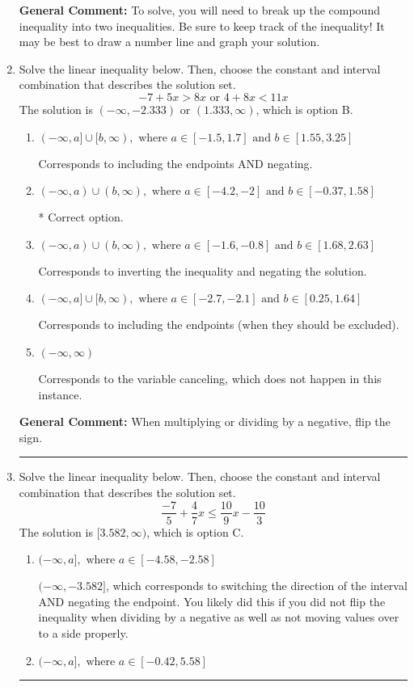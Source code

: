 \documentclass{extbook}[14pt]
\newcommand{\litem}[1]{\item #1

\rule{\textwidth}{0.4pt}}
\begin{document}
\begin{enumerate}
{\textbf{General Comment:} To solve, you will need to break up the compound inequality into two inequalities. Be sure to keep track of the inequality! It may be best to draw a number line and graph your solution.
}
\litem{
Solve the linear inequality below. Then, choose the constant and interval combination that describes the solution set.
\[ -7 + 5 x > 8 x \text{ or } 4 + 8 x < 11 x \]The solution is \( (-\infty, -2.333) \text{ or } (1.333, \infty) \), which is option B.\begin{enumerate}[label=\Alph*.]
\item \( (-\infty, a] \cup [b, \infty), \text{ where } a \in [-1.5, 1.7] \text{ and } b \in [1.55, 3.25] \)

Corresponds to including the endpoints AND negating.
\item \( (-\infty, a) \cup (b, \infty), \text{ where } a \in [-4.2, -2] \text{ and } b \in [-0.37, 1.58] \)

 * Correct option.
\item \( (-\infty, a) \cup (b, \infty), \text{ where } a \in [-1.6, -0.8] \text{ and } b \in [1.68, 2.63] \)

Corresponds to inverting the inequality and negating the solution.
\item \( (-\infty, a] \cup [b, \infty), \text{ where } a \in [-2.7, -2.1] \text{ and } b \in [0.25, 1.64] \)

Corresponds to including the endpoints (when they should be excluded).
\item \( (-\infty, \infty) \)

Corresponds to the variable canceling, which does not happen in this instance.
\end{enumerate}

\textbf{General Comment:} When multiplying or dividing by a negative, flip the sign.
}
\litem{
Solve the linear inequality below. Then, choose the constant and interval combination that describes the solution set.
\[ \frac{-7}{5} + \frac{4}{7} x \leq \frac{10}{9} x - \frac{10}{3} \]The solution is \( [3.582, \infty) \), which is option C.\begin{enumerate}[label=\Alph*.]
\item \( (-\infty, a], \text{ where } a \in [-4.58, -2.58] \)

 $(-\infty, -3.582]$, which corresponds to switching the direction of the interval AND negating the endpoint. You likely did this if you did not flip the inequality when dividing by a negative as well as not moving values over to a side properly.
\item \( (-\infty, a], \text{ where } a \in [-0.42, 5.58] \)


\end{enumerate}}
\end{enumerate}
\end{document}
